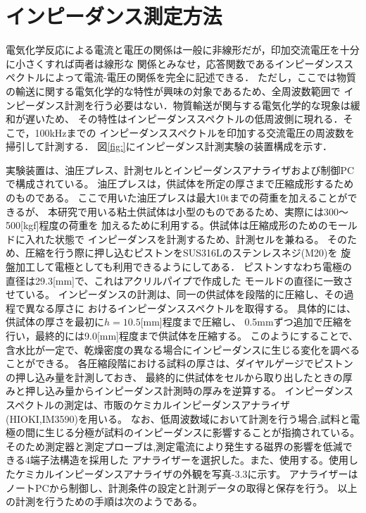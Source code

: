 \section{インピーダンス測定方法}
電気化学反応による電流と電圧の関係は一般に非線形だが，印加交流電圧を十分に小さくすれば両者は線形な
関係とみなせ，応答関数であるインピーダンススペクトルによって電流-電圧の関係を完全に記述できる．
ただし，ここでは物質の輸送に関する電気化学的な特性が興味の対象であるため、全周波数範囲で
インピーダンス計測を行う必要はない．物質輸送が関与する電気化学的な現象は緩和が遅いため、
その特性はインピーダンススペクトルの低周波側に現れる．そこで，100kHzまでの
インピーダンススペクトルを印加する交流電圧の周波数を掃引して計測する．
図\ref{fig:}にインピーダンス計測実験の装置構成を示す．

実験装置は、油圧プレス、計測セルとインピーダンスアナライザおよび制御PCで構成されている。
油圧プレスは，供試体を所定の厚さまで圧縮成形するためのものである。
ここで用いた油圧プレスは最大10tまでの荷重を加えることができるが、
本研究で用いる粘土供試体は小型のものであるため、実際には300〜500[kgf]程度の荷重を
加えるために利用する。供試体は圧縮成形のためのモールドに入れた状態で
インピーダンスを計測するため、計測セルを兼ねる。
そのため、圧縮を行う際に押し込むピストンをSUS316Lのステンレスネジ(M20)を
旋盤加工して電極としても利用できるようにしてある．
ピストンすなわち電極の直径は29.3[mm]で、これはアクリルパイプで作成した
モールドの直径に一致させている。
インピーダンスの計測は、同一の供試体を段階的に圧縮し、その過程で異なる厚さに
おけるインピーダンススペクトルを取得する。
具体的には、供試体の厚さを最初に$h=10.5$[mm]程度まで圧縮し、
0.5mmずつ追加で圧縮を行い，最終的には9.0[mm]程度まで供試体を圧縮する。
このようにすることで、含水比が一定で、乾燥密度の異なる場合にインピーダンスに生じる変化を調べることができる。
各圧縮段階における試料の厚さは、ダイヤルゲージでピストンの押し込み量を計測しておき、
最終的に供試体をセルから取り出したときの厚みと押し込み量からインピーダンス計測時の厚みを逆算する。
インピーダンススペクトルの測定は、市販のケミカルインピーダンスアナライザ(HIOKI,IM3590)を用いる。
なお、低周波数域において計測を行う場合,試料と電極の間に生じる分極が試料のインピーダンスに影響することが指摘されている。
そのため測定器と測定プローブは,測定電流により発生する磁界の影響を低減できる4端子法構造を採用した
アナライザーを選択した。また、使用する。使用したケミカルインピーダンスアナライザの外観を写真-3.3に示す。
アナライザーはノートPCから制御し、計測条件の設定と計測データの取得と保存を行う。
以上の計測を行うための手順は次のようである。
